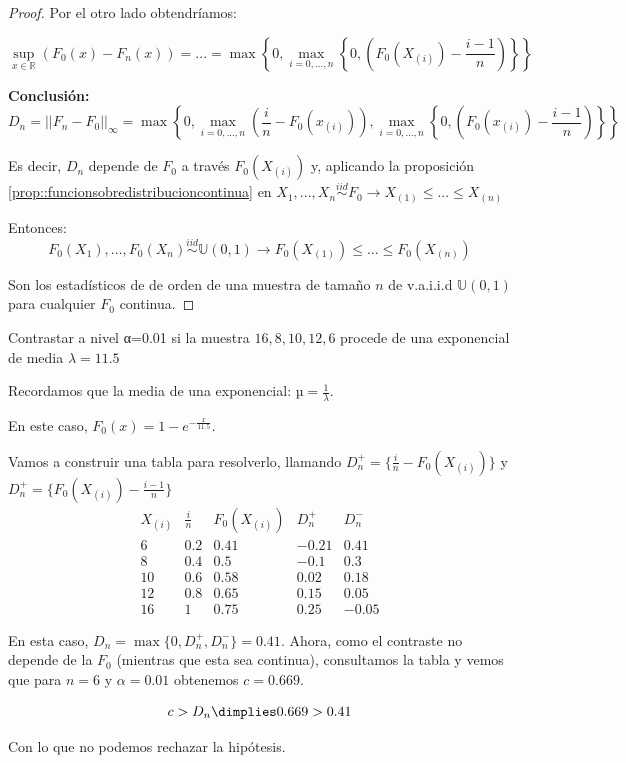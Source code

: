 \begin{proof}
Por el otro lado obtendríamos:

\[
\sup_{x\in ℝ} (F_0(x) - F_n(x)) = ... = \max \left\{0,\max_{i=0,...,n} \left\{0, \left(F_0(X_{(i)}) - \frac{i-1}{n}\right)\right\}\right\}
\]

\textbf{Conclusión:}
\[D_n = ||F_n - F_0||_{\infty} = \max \left\{ 0, \max_{i=0,...,n} \left( \frac{i}{n} - F_0(x_{(i)})\right), \max_{i=0,...,n} \left\{0, \left(F_0(x_{(i)}) - \frac{i-1}{n}\right)\right\}\right\}\]

Es decir, $D_n$ depende de $F_0$ a través $F_0(X_{(i)})$ y, aplicando la proposición \ref{prop::funcionsobredistribucioncontinua} en $X_1,...,X_n \overset{iid}{\sim} F_0 \to X_{(1)} \leq ... \leq X_{(n)}$

Entonces: 
\[
F_0(X_1),...,F_0(X_n) \overset{iid}{\sim} \mathbb{U}(0,1) \to F_0(X_{(1)})\leq ... \leq F_0(X_{(n)})
\]


Son los estadísticos de de orden de una muestra de tamaño $n$ de v.a.i.i.d $\mathbb{U}(0,1)$ para cualquier $F_0$ continua.

\end{proof}

\begin{example}
Contrastar a nivel α=0.01 si la muestra $16,8,10,12,6$ procede de una exponencial de media $λ=11.5$

Recordamos que la media de una exponencial: $µ = \frac{1}{λ}$.

En este caso, $F_0(x) = 1-e^{-\frac{x}{11.5}}$.


Vamos a construir una tabla para resolverlo, llamando $D_n^+ = \{\frac{i}{n} - F_0(X_{(i)})\}$ y $D_n^+ = \{F_0(X_{(i)}) - \frac{i-1}{n} \}$
\[
\begin{array}{cccccc}
X_{(i)} & \frac{i}{n} & F_0(X_{(i)}) & D_n^+ & D_n^-\\\hline
6&0.2&0.41&-0.21&0.41\\
8&0.4&0.5&-0.1&0.3 \\
10&0.6&0.58&0.02&0.18 \\
12&0.8&0.65&0.15&0.05 \\
16&1&0.75&0.25&-0.05
\end{array}\]


En esta caso, $D_n = \max\{0,D_n^+,D_n^-\} = 0.41$. Ahora, como el contraste no depende de la $F_0$ (mientras que esta sea continua), consultamos la tabla y vemos que para $n=6$ y $α=0.01$ obtenemos $c=0.669$.

\[c>D_n \dimplies 0.669 > 0.41\]

Con lo que no podemos rechazar la hipótesis.

\end{example}


